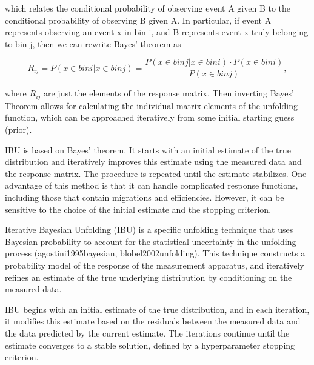         which relates the conditional probability of observing event A given B to the conditional probability of observing B given A. In particular, if event A represents observing an event x in bin i, and B represents event x truly belonging to bin j, then we can rewrite Bayes' theorem as 

        \begin{equation}
            R_{ij} = P(x \in bin i| x \in bin j) = \frac{P(x \in bin j|x \in bin i) \cdot P(x \in bin i)}{P(x \in bin j)},
        \end{equation}\label{eq:bayes}

        where $R_{ij}$ are just the elements of the response matrix. Then inverting Bayes' Theorem allows for calculating the individual matrix elements of the unfolding function, which can be approached iteratively from some initial starting guess (prior). 




        
        
        IBU is based on Bayes' theorem. It starts with an initial estimate of the true distribution and iteratively improves this estimate using the measured data and the response matrix. The procedure is repeated until the estimate stabilizes. One advantage of this method is that it can handle complicated response functions, including those that contain migrations and efficiencies. However, it can be sensitive to the choice of the initial estimate and the stopping criterion.
    
        Iterative Bayesian Unfolding (IBU) is a specific unfolding technique that uses Bayesian probability to account for the statistical uncertainty in the unfolding process (agostini1995bayesian, blobel2002unfolding). This technique constructs a probability model of the response of the measurement apparatus, and iteratively refines an estimate of the true underlying distribution by conditioning on the measured data.




        IBU begins with an initial estimate of the true distribution, and in each iteration, it modifies this estimate based on the residuals between the measured data and the data predicted by the current estimate. The iterations continue until the estimate converges to a stable solution, defined by a hyperparameter stopping criterion. 


